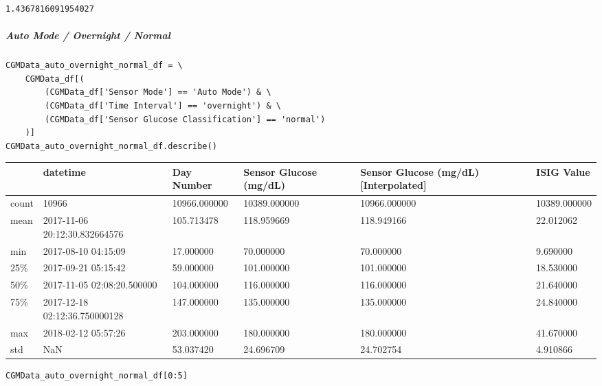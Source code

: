 \begin{verbatim}
1.4367816091954027
\end{verbatim}

\subparagraph{Auto Mode / Overnight / Normal}

\begin{verbatim}
CGMData_auto_overnight_normal_df = \
    CGMData_df[(
        (CGMData_df['Sensor Mode'] == 'Auto Mode') & \
        (CGMData_df['Time Interval'] == 'overnight') & \
        (CGMData_df['Sensor Glucose Classification'] == 'normal')
    )]
CGMData_auto_overnight_normal_df.describe()
\end{verbatim}

\bigskip\noindent
\begin{tabular}{p{}p{}p{}p{}p{}p{}}
\toprule
 & datetime & Day Number & Sensor Glucose (mg/dL) & Sensor Glucose (mg/dL) [Interpolated] & ISIG Value \\
\hline
count & 10966 & 10966.000000 & 10389.000000 & 10966.000000 & 10389.000000 \\
\hline
mean & 2017-11-06 20:12:30.832664576 & 105.713478 & 118.959669 & 118.949166 & 22.012062 \\
\hline
min & 2017-08-10 04:15:09 & 17.000000 & 70.000000 & 70.000000 & 9.690000 \\
\hline
25\% & 2017-09-21 05:15:42 & 59.000000 & 101.000000 & 101.000000 & 18.530000 \\
\hline
50\% & 2017-11-05 02:08:20.500000 & 104.000000 & 116.000000 & 116.000000 & 21.640000 \\
\hline
75\% & 2017-12-18 02:12:36.750000128 & 147.000000 & 135.000000 & 135.000000 & 24.840000 \\
\hline
max & 2018-02-12 05:57:26 & 203.000000 & 180.000000 & 180.000000 & 41.670000 \\
\hline
std & NaN & 53.037420 & 24.696709 & 24.702754 & 4.910866 \\
\hline
\bottomrule
\end{tabular}

\bigskip

\begin{verbatim}
CGMData_auto_overnight_normal_df[0:5]
\end{verbatim}

